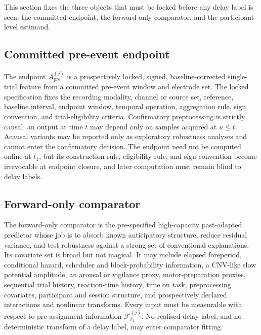 \documentclass[11pt,a4paper]{article}
\theoremstyle{definition}
\newcommand{\F}{\mathcal{F}}
\newcommand{\Apre}{A_{\mathrm{pre}}}
\begin{document}
This section fixes the three objects that must be locked before any delay label
is seen: the committed endpoint, the forward-only comparator, and the
participant-level estimand.

\subsection{Committed pre-event endpoint}
\label{sec:endpoint}

The endpoint \(\Apre^{(j)}\) is a prospectively locked, signed,
baseline-corrected single-trial feature from a committed pre-event window and
electrode set. The locked specification fixes the recording modality, channel or
source set, reference, baseline interval, endpoint window, temporal operation,
aggregation rule, sign convention, and trial-eligibility criteria. Confirmatory
preprocessing is strictly causal: an output at time \(t\) may depend only on
samples acquired at \(u\leq t\). Acausal variants may be reported only as
exploratory robustness analyses and cannot enter the confirmatory decision. The
endpoint need not be computed online at \(t_1\), but its construction rule,
eligibility rule, and sign convention become irrevocable at endpoint closure, and
later computation must remain blind to delay labels.

\subsection{Forward-only comparator}
\label{sec:comparator}

The forward-only comparator is the pre-specified high-capacity past-adapted
predictor whose job is to absorb known anticipatory structure, reduce residual
variance, and test robustness against a strong set of conventional explanations.
Its covariate set is broad but not magical. It may include elapsed foreperiod,
conditional hazard, scheduler and block-probability information, a CNV-like slow
potential amplitude, an arousal or vigilance proxy, motor-preparation proxies,
sequential trial history, reaction-time history, time on task, preprocessing
covariates, participant and session structure, and prospectively declared
interactions and nonlinear transforms. Every input must be measurable with
respect to pre-assignment information \(\F_{t_1}^{(j)}\). No realised-delay label,
and no deterministic transform of a delay label, may enter comparator fitting.
\end{document}
